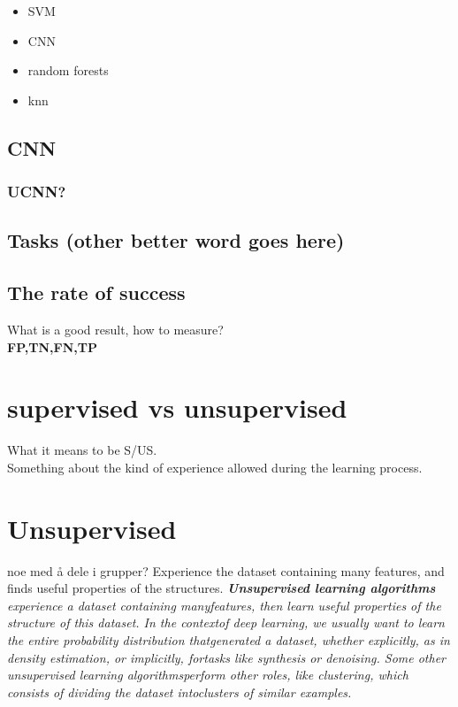 \documentclass[a4paper,english]{ifimaster}
\begin{document}
	  \begin{itemize}
	    \item SVM 
	    \item CNN 
	    \item random forests
	    \item knn
	  \end{itemize}
	  
	  \subsection{CNN}
	  \subsubsection{UCNN?}
	  
	  
	  
	  
	  
	
	
	
	
	  \subsection{Tasks (other better word goes here)}
\label{chap:Tasks}

\subsection{The rate of success}
What is a good result, how to measure?\\
\textbf{FP,TN,FN,TP}\\


\section{supervised vs unsupervised}
What it means to be S/US.\\
Something about the kind of experience allowed during the learning process.


\section{Unsupervised}
noe med å dele i grupper?
Experience the dataset containing many features, and finds useful properties of the structures. 
\textit{\textbf{Unsupervised learning algorithms} experience a dataset containing manyfeatures, then learn useful properties of the structure of this dataset. In the contextof deep learning, we usually want to learn the entire probability distribution thatgenerated a dataset, whether explicitly, as in density estimation, or implicitly, fortasks like synthesis or denoising. Some other unsupervised learning algorithmsperform other roles, like clustering, which consists of dividing the dataset intoclusters of similar examples.}
\cite{Goodfellow-et-al-2016}
\end{document}
